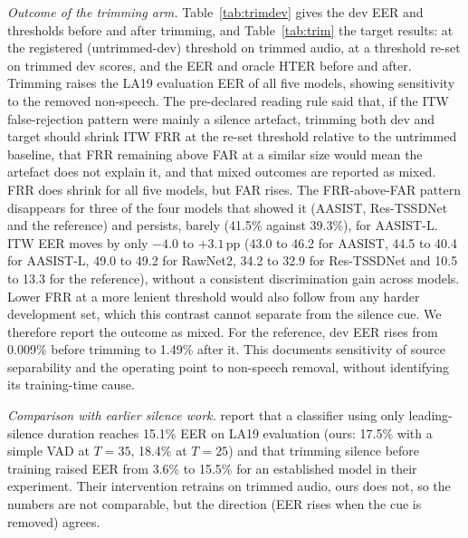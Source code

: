 \documentclass[10pt]{article}
\begin{document}
\emph{Outcome of the trimming arm.} Table~\ref{tab:trimdev} gives the dev EER and thresholds before and after trimming, and
Table~\ref{tab:trim} the target results: at the registered (untrimmed-dev) threshold on trimmed audio, at a threshold re-set on trimmed dev
scores, and the EER and oracle HTER before and after. Trimming raises the LA19 evaluation EER of all five models,
showing sensitivity to the removed non-speech. The pre-declared reading rule said that, if the ITW false-rejection pattern were mainly a silence artefact, trimming both dev and target
should shrink ITW FRR at the re-set threshold relative to the untrimmed baseline, that FRR remaining above FAR at a similar size would mean the
artefact does not explain it, and that mixed outcomes are reported as mixed. FRR does shrink for all five models, but FAR rises. The FRR-above-FAR pattern disappears for three of the four models that showed it (AASIST, Res-TSSDNet and the reference) and persists, barely
(41.5\% against 39.3\%), for AASIST-L. ITW EER moves by only \(-4.0\) to \(+3.1\)\,pp (43.0 to 46.2 for AASIST, 44.5
to 40.4 for AASIST-L, 49.0 to 49.2 for RawNet2, 34.2 to 32.9 for Res-TSSDNet and 10.5 to 13.3 for the reference),
without a consistent discrimination gain across models. Lower FRR at a more lenient threshold would also follow from
any harder development set, which this contrast cannot separate from the silence cue. We therefore report the outcome
as mixed. For the reference, dev EER rises from 0.009\% before trimming to 1.49\% after it. This documents sensitivity
of source separability and the operating point to non-speech removal, without identifying its training-time cause.

\emph{Comparison with earlier silence work.} \citet{muller21_silence} report that a classifier using only leading-silence duration reaches 15.1\% EER
on LA19 evaluation (ours: 17.5\% with a simple VAD at \(T=35\), 18.4\% at \(T=25\)) and that trimming silence before training raised EER from
3.6\% to 15.5\% for an established model in their experiment. Their intervention retrains on trimmed audio, ours does not, so the numbers are not comparable, but the direction (EER rises when the cue is removed) agrees.

\begin{table}[!ht]
\caption{Dev EER and thresholds before and after trimming (the trimmed thresholds are computed from trimmed dev scores only).}
\label{tab:trimdev}
\centering
\footnotesize

\end{table}
\end{document}
